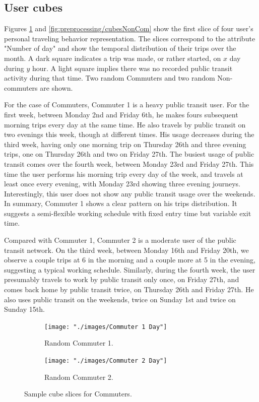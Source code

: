 \documentclass{article}
\begin{document}
\subsection{User cubes}
\label{sec:userCubes}
Figures \ref{fig:preprocessing/cubesCom} and \ref{fig:preprocessing/cubesNonCom} show the first slice of four user's personal traveling behavior representation. The slices correspond to the attribute "Number of day" and show the temporal distribution of their trips over the month. A dark square indicates a trip was made, or rather started, on $x$ day during $y$ hour. A light square implies there was no recorded public transit activity during that time. Two random Commuters and two random Non-commuters are shown. 

For the case of Commuters, Commuter 1 is a heavy public transit user. For the first week, between Monday 2nd and Friday 6th, he makes fours subsequent morning trips every day at the same time. He also travels by public transit on two evenings this week, though at different times. His usage decreases during the third week, having only one morning trip on Thursday 26th and three evening trips, one on Thursday 26th and two on Friday 27th. The busiest usage of public transit comes over the fourth week, between Monday 23rd and Friday 27th. This time the user performs his morning trip every day of the week, and travels at least once every evening, with Monday 23rd showing three evening journeys. Interestingly, this user does not show any public transit usage over the weekends. In summary, Commuter 1 shows a clear pattern on his trips distribution. It suggests a semi-flexible working schedule with fixed entry time but variable exit time. 

Compared with Commuter 1, Commuter 2 is a moderate user of the public transit network. On the third week, between Monday 16th and Friday 20th, we observe a couple trips at 6 in the morning and a couple more at 5 in the evening, suggesting a typical working schedule. Similarly, during the fourth week, the user presumably travels to work by public transit only once, on Friday 27th, and comes back home by public transit twice, on Thursday 26th and Friday 27th. He also uses public transit on the weekends, twice on Sunday 1st and twice on Sunday 15th.

\begin{figure}[H]
  \centering
  \begin{subfigure}[b]{.45\textwidth}
  	\centering
	\texttt{[image: "./images/Commuter 1 Day"]}
  	\caption{Random Commuter 1.}
  \end{subfigure}
  \begin{subfigure}[b]{.45\textwidth}
  	\centering
	\texttt{[image: "./images/Commuter 2 Day"]}
  	\caption{Random Commuter 2.}
  \end{subfigure}
  \caption{Sample cube slices for Commuters.}
  	\label{fig:preprocessing/cubesCom} 
\end{figure}
\end{document}
